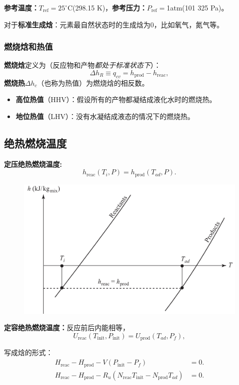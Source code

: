 \textbf{参考温度：}$T_\mathrm{ref}=25^\circ \mathrm{C}$(298.15 K)，\textbf{参考压力：}$P_\mathrm{ref}=$1atm(101 325 Pa)。

对于\textbf{标准生成焓}：元素最自然状态时的生成焓为0，比如氧气，氮气等。

\subsubsection{燃烧焓和热值}
\textbf{燃烧焓}定义为（反应物和产物\textit{都处于标准状态下}）：
\begin{equation}
    \Delta h_{R}\equiv q_{c v}=h_{\mathrm{prod}}-h_{\mathrm{reac}},
\end{equation}
\textbf{燃烧热}$\Delta h_c$（也称为热值）为燃烧焓的相反数。
\begin{itemize}
    \item \textbf{高位热值}（HHV）：假设所有的产物都凝结成液化水时的燃烧热。
    \item \textbf{地位热值}（LHV）：没有水凝结成液态的情况下的燃烧热。
\end{itemize}

\subsection{绝热燃烧温度}

\textbf{定压绝热燃烧温度: }
\begin{equation}
    h_{\mathrm{reac}}(T_{i},P)=h_{\mathrm{prod}}(T_{a d},P).
\end{equation}

\begin{figure}[H]
    \centering
    \includegraphics[width=.23\textwidth]{img/ad_T.png}
\end{figure}

\textbf{定容绝热燃烧温度：}反应前后内能相等，
\begin{equation}
    U_{\mathrm{reac}}(T_{\mathrm{init}},P_{\mathrm{init}})=U_{\mathrm{prod}}(T_{a d},P_{f}),
\end{equation}

写成焓的形式：
\begin{equation}
    \begin{aligned}
        H_{\mathrm{reac}}-H_{\mathrm{prod}}-V(P_{\mathrm{init}}-P_{f})&=0.\\
        H_{\mathrm{reac}}-H_{\mathrm{prod}}-R_{u}(N_{\mathrm{reac}}T_{\mathrm{init}}-N_{\mathrm{prod}}T_{a d})&=0.
    \end{aligned}
\end{equation}

